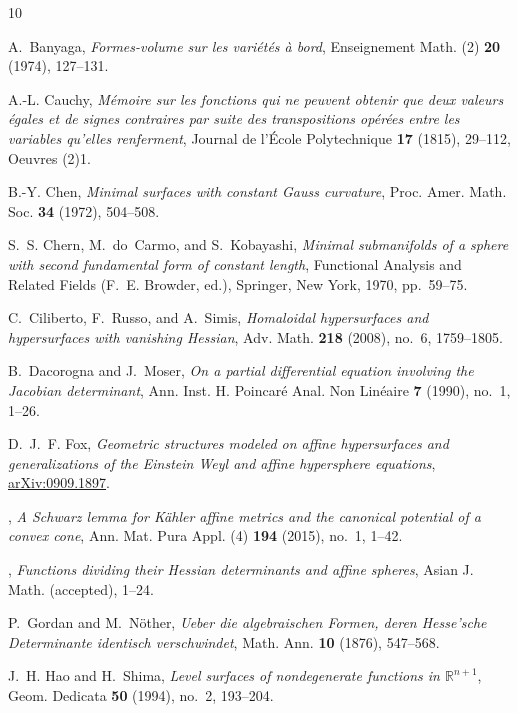 \documentclass [leqno, 10pt]{amsart}
\theoremstyle{definition}
\numberwithin{equation}{section}
\begin{document}
\begin{thebibliography}{10}

A.~Banyaga, \emph{Formes-volume sur les vari\'et\'es \`a bord}, Enseignement
  Math. (2) \textbf{20} (1974), 127--131.

A.-L. Cauchy, \emph{M\'emoire sur les fonctions qui ne peuvent obtenir que deux
  valeurs \'egales et de signes contraires par suite des transpositions
  opérées entre les variables qu'elles renferment}, Journal de l{'}{\'E}cole
  {P}olytechnique \textbf{17} (1815), 29--112, Oeuvres (2)1.

B.-Y. Chen, \emph{Minimal surfaces with constant {G}auss curvature}, Proc.
  Amer. Math. Soc. \textbf{34} (1972), 504--508.

S.~S. Chern, M.~do~Carmo, and S.~Kobayashi, \emph{Minimal submanifolds of a
  sphere with second fundamental form of constant length}, Functional
  {A}nalysis and {R}elated {F}ields (F.~E. Browder, ed.), Springer, New York,
  1970, pp.~59--75.

C.~Ciliberto, F.~Russo, and A.~Simis, \emph{Homaloidal hypersurfaces and
  hypersurfaces with vanishing {H}essian}, Adv. Math. \textbf{218} (2008),
  no.~6, 1759--1805.

B.~Dacorogna and J.~Moser, \emph{On a partial differential equation involving
  the {J}acobian determinant}, Ann. Inst. H. Poincar\'e Anal. Non Lin\'eaire
  \textbf{7} (1990), no.~1, 1--26.

D.~J.~F. Fox, \emph{Geometric structures modeled on affine hypersurfaces and
  generalizations of the {E}instein {W}eyl and affine hypersphere equations},
  \href{http://arxiv.org/abs/0909.1897}{arXiv:0909.1897}.

\bysame, \emph{A {S}chwarz lemma for {K}\"ahler affine metrics and the
  canonical potential of a convex cone}, Ann. Mat. Pura Appl. (4) \textbf{194}
  (2015), no.~1, 1--42.

\bysame, \emph{Functions dividing their {H}essian determinants and affine
  spheres}, Asian J. Math. (accepted), 1--24.

P.~Gordan and M.~N{\"o}ther, \emph{{Ueber die algebraischen Formen, deren
  Hesse'sche Determinante identisch verschwindet}}, Math. Ann. \textbf{10}
  (1876), 547--568.

J.~H. Hao and H.~Shima, \emph{Level surfaces of nondegenerate functions in
  {${\mathbb{R}}^{n+1}$}}, Geom. Dedicata \textbf{50} (1994), no.~2, 193--204.


\end{thebibliography}
\end{document}
